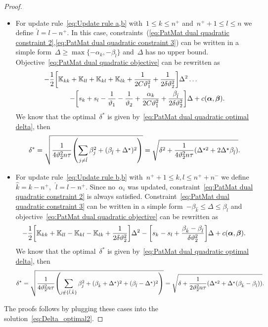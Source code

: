 \begin{proof}
\begin{itemize}
    \item For update rule~\eqref{eq:Update rule a,b} with~$1 \le k \le n^+$ and~$n^+ + 1 \le l \le n$ we define~$\hat{l} = l - n^+.$ In this case, constraints~(\ref{eq:PatMat dual quadratic constraint 2},\ref{eq:PatMat dual quadratic constraint 3}) can be written in a simple form~$\Delta \geq \max \{- \alpha_k, - \beta_{\hat{l}}\}$ and~$\Delta$ has no upper bound. Objective~\eqref{eq:PatMat dual quadratic objective} can be rewritten as
    \begin{equation*}
      \begin{split}
        - \frac{1}{2} \Brac[s]{\K_{kk} + \K_{ll} + \K_{kl} + \K_{lk} + \frac{1}{2C\vartheta_1^2} + \frac{1}{2\delta\vartheta_2^2}} \Delta^2 \dots \qquad\qquad \\ 
        - \Brac[s]{s_k + s_l - \frac{1}{\vartheta_1} - \frac{1}{\vartheta_2} + \frac{\alpha_k}{2C\vartheta_1^2} + \frac{\beta_{\hat l}}{2\delta\vartheta_2^2}} \Delta + c(\bm{\alpha}, \bm{\beta}).
      \end{split}
    \end{equation*}
    We know that the optimal~$\delta^*$ is given by~\eqref{eq:PatMat dual quadratic optimal delta}, then
    \begin{equation*}
      \delta^*
      = \sqrt{\frac{1}{4\vartheta_2^2 n \tau} \Brac{\sum_{j\neq \hat l} \beta_j^2 + (\beta_{\hat{l}} + \Delta^\star)^2}}
      = \sqrt{\delta^2 + \frac{1}{4\vartheta_2^2 n \tau} (\Delta^{\star2} + 2\Delta^\star \beta_{\hat{l}})}.
    \end{equation*}

    \item For update rule~\eqref{eq:Update rule b,b} with~$n^+ + 1\le k,l \le n^+ + n^-$ we define~$\hat{k} = k - n^+,$~$\hat{l} = l - n^+.$ Since no~$\alpha_i$ was updated, constraint~\eqref{eq:PatMat dual quadratic constraint 2} is always satisfied. Constraint~\eqref{eq:PatMat dual quadratic constraint 3} can be written in a simple form~$-\beta_{\hat{k}} \leq \Delta \leq \beta_{\hat{l}}$ and objective~\eqref{eq:PatMat dual quadratic objective} can be rewritten as
    \begin{equation*}
      - \frac{1}{2} \Brac[s]{\K_{kk} + \K_{ll} - \K_{kl} - \K_{lk} + \frac{1}{2\delta\vartheta_2^2}} \Delta^2 - \Brac[s]{s_k - s_l + \frac{\beta_{\hat{k}} - \beta_{\hat{l}}}{\delta\vartheta_2^2}} \Delta + c(\bm{\alpha}, \bm{\beta}).
    \end{equation*}
    We know that the optimal~$\delta^*$ is given by~\eqref{eq:PatMat dual quadratic optimal delta}, then
    \begin{equation*}
      \delta^*
      = \sqrt{\frac{1}{4\vartheta_2^2 n \tau} \Brac{\sum_{j \notin \{\hat{l}, \hat{k}\}} \beta_j^2 + (\beta_{\hat{k}} + \Delta^\star)^2 + (\beta_{\hat{l}} - \Delta^\star)^2}} 
      = \sqrt{\delta + \frac{1}{2\vartheta_2^2 n \tau} (\Delta^{\star2} + \Delta^\star (\beta_{\hat{k}} - \beta_{\hat{l}}))}.
    \end{equation*}
  \end{itemize}
  The proofs follows by plugging these cases into the solution~\eqref{eq:Delta_optimal2}.
\end{proof}

